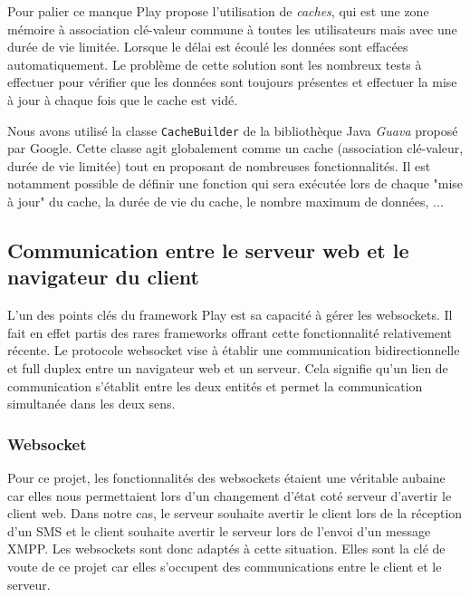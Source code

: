 Pour palier ce manque Play propose l'utilisation de \textit{caches}, qui est une zone mémoire à association clé-valeur commune à toutes les utilisateurs mais avec une durée de vie limitée.
Lorsque le délai est écoulé les données sont effacées automatiquement.
Le problème de cette solution sont les nombreux tests à effectuer pour vérifier que les données sont toujours présentes et effectuer la mise à jour à chaque fois que le cache est vidé.

Nous avons utilisé la classe \lstinline{CacheBuilder} de la bibliothèque Java \textit{Guava} proposé par Google.
Cette classe agit globalement comme un cache (association clé-valeur, durée de vie limitée) tout en proposant de nombreuses fonctionnalités.
Il est notamment possible de définir une fonction qui sera exécutée lors de chaque "mise à jour" du cache, la durée de vie du cache, le nombre maximum de données, ...



\subsection{Communication entre le serveur web et le navigateur du client}

L'un des points clés du framework Play est sa capacité à gérer les websockets. Il fait en effet partis des rares
frameworks offrant cette fonctionnalité relativement récente. Le protocole websocket vise à établir 
une communication bidirectionnelle et full duplex entre un navigateur web et un serveur. Cela signifie
qu'un lien de communication s'établit entre les deux entités et permet la communication simultanée
dans les deux sens. 


\subsubsection{Websocket}

Pour ce projet, les fonctionnalités des websockets étaient une véritable aubaine car elles nous permettaient
lors d'un changement d'état coté serveur d'avertir le client web. Dans notre cas, le serveur souhaite avertir
le client lors de la réception d'un SMS et le client souhaite avertir le serveur lors de l'envoi d'un message
XMPP. Les websockets sont donc adaptés à cette situation. Elles sont la clé de voute de ce projet car elles 
s'occupent des communications entre le client et le serveur.


